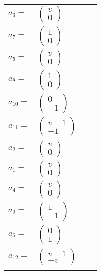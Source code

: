 \documentclass[1p]{elsarticle_modified}
\theoremstyle{definition}
\begin{document}
\begin{tabular}{m{7pt} m{180pt} m{7pt} m{180pt} }
\flushright $a_{3}=$&$\begin{pmatrix}v\\0\end{pmatrix}$ \\
\flushright $a_{7}=$&$\begin{pmatrix}1\\0\end{pmatrix}$ \\
\flushright $a_{5}=$&$\begin{pmatrix}v\\0\end{pmatrix}$ \\
\flushright $a_{8}=$&$\begin{pmatrix}1\\0\end{pmatrix}$ \\
\flushright $a_{10}=$&$\begin{pmatrix}0\\-1\end{pmatrix}$ \\
\flushright $a_{11}=$&$\begin{pmatrix}v-1\\-1\end{pmatrix}$ \\
\flushright $a_{2}=$&$\begin{pmatrix}v\\0\end{pmatrix}$ \\
\flushright $a_{1}=$&$\begin{pmatrix}v\\0\end{pmatrix}$ \\
\flushright $a_{4}=$&$\begin{pmatrix}v\\0\end{pmatrix}$ \\
\flushright $a_{9}=$&$\begin{pmatrix}1\\-1\end{pmatrix}$ \\
\flushright $a_{6}=$&$\begin{pmatrix}0\\1\end{pmatrix}$ \\
\flushright $a_{12}=$&$\begin{pmatrix}v-1\\- v\end{pmatrix}$\\&\end{tabular}
\end{document}

